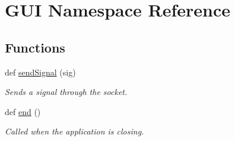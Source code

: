\hypertarget{namespace_g_u_i}{}\section{G\+UI Namespace Reference}
\label{namespace_g_u_i}
\subsection*{Functions}
\begin{DoxyCompactItemize}
\item 
def \mbox{\hyperlink{namespace_g_u_i_ae82f740e6453cdd542b52ede1560c2c3}{send\+Signal}} (sig)
\begin{DoxyCompactList}\small\item\em Sends a signal through the socket. \end{DoxyCompactList}\item 
def \mbox{\hyperlink{namespace_g_u_i_a6331e60bc4c66b1f0460cd987e6b0d1d}{end}} ()
\begin{DoxyCompactList}\small\item\em Called when the application is closing. \end{DoxyCompactList}\end{DoxyCompactItemize}
